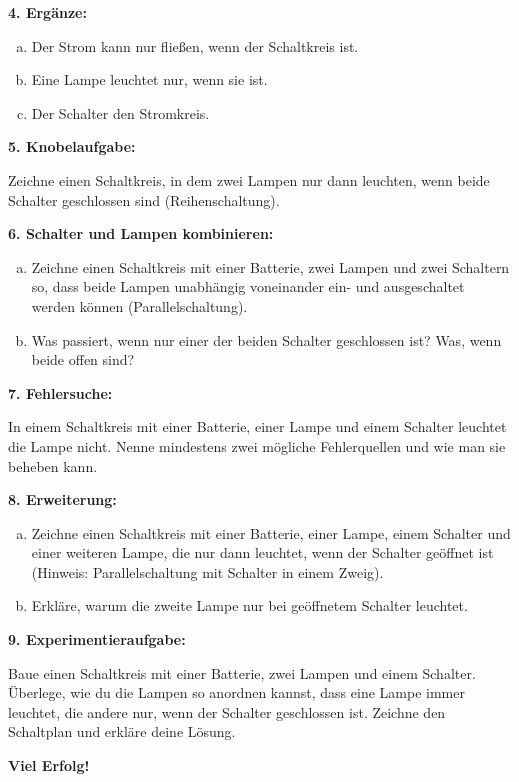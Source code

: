 \textbf{4. Ergänze:}

\begin{enumerate}[a)]
    \item Der Strom kann nur fließen, wenn der Schaltkreis \underline{\hspace{2cm}} ist.
    \item Eine Lampe leuchtet nur, wenn sie \underline{\hspace{2cm}} ist.
    \item Der Schalter \underline{\hspace{2cm}} den Stromkreis.
\end{enumerate}

\vspace{0.5em}

\textbf{5. Knobelaufgabe:}

Zeichne einen Schaltkreis, in dem zwei Lampen nur dann leuchten, wenn beide Schalter geschlossen sind (Reihenschaltung).

\vspace{1em}


\textbf{6. Schalter und Lampen kombinieren:}

\begin{enumerate}[a)]
    \item Zeichne einen Schaltkreis mit einer Batterie, zwei Lampen und zwei Schaltern so, dass beide Lampen unabhängig voneinander ein- und ausgeschaltet werden können (Parallelschaltung).
    \item Was passiert, wenn nur einer der beiden Schalter geschlossen ist? Was, wenn beide offen sind?
\end{enumerate}

\vspace{1em}

\textbf{7. Fehlersuche:}

In einem Schaltkreis mit einer Batterie, einer Lampe und einem Schalter leuchtet die Lampe nicht. Nenne mindestens zwei mögliche Fehlerquellen und wie man sie beheben kann.

\vspace{1em}

\textbf{8. Erweiterung:}

\begin{enumerate}[a)]
    \item Zeichne einen Schaltkreis mit einer Batterie, einer Lampe, einem Schalter und einer weiteren Lampe, die nur dann leuchtet, wenn der Schalter geöffnet ist (Hinweis: Parallelschaltung mit Schalter in einem Zweig).
    \item Erkläre, warum die zweite Lampe nur bei geöffnetem Schalter leuchtet.
\end{enumerate}

\vspace{1em}

\textbf{9. Experimentieraufgabe:}

Baue einen Schaltkreis mit einer Batterie, zwei Lampen und einem Schalter. Überlege, wie du die Lampen so anordnen kannst, dass eine Lampe immer leuchtet, die andere nur, wenn der Schalter geschlossen ist. Zeichne den Schaltplan und erkläre deine Lösung.

\textbf{Viel Erfolg!}
